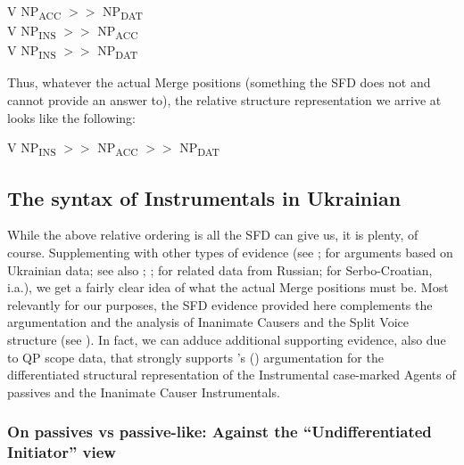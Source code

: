 \documentclass[output=paper,colorlinks,citecolor=brown]{langscibook}
\begin{document}
\ea \label{ex:antonyuk:31}
  V NP\textsubscript{ACC} $>>$ NP\textsubscript{DAT}\\
V NP\textsubscript{INS} $>>$ NP\textsubscript{ACC} \\
V NP\textsubscript{INS} $>>$ NP\textsubscript{DAT}
\z


\noindent Thus, whatever the actual Merge positions (something the SFD does not and cannot provide an answer to), the relative structure representation we arrive at looks like the following:


\ea%
    \label{ex:antonyuk:32}

          V NP\textsubscript{INS} $>>$ NP\textsubscript{ACC} $>>$ NP\textsubscript{DAT}

\z


\subsection{The syntax of Instrumentals in Ukrainian}
\label{sec:antonyuk:3.2}


While the above relative ordering is all the SFD can give us, it is plenty, of course. Supplementing with other types of evidence (see \citealt{AntonyukMykhaylyk2022}; \citealt{AntonyukUnderReview} for arguments based on Ukrainian data; see also \citealt{Bailyn2010,Bailyn2012}; \citealt{Antonyuk2015,Antonyuk2020,Antonyuk2023}; \citealt{Titov2017} for related data from Russian; \citealt{Kovacevic2020} for Serbo-Croatian, i.a.), we get a fairly clear idea of what the actual Merge positions must be. Most relevantly for our purposes, the SFD evidence provided here complements the argumentation and the analysis of Inanimate Causers and the Split Voice structure (see \citealt{Pylkkänen2002,Pylkkänen2008}). In fact, we can adduce additional supporting evidence, also due to QP scope data, that strongly supports \citeauthor{Lavine2022}'s (\citeyear{Lavine2022, Lavine2023}) argumentation for the differentiated structural representation of the Instrumental case-marked Agents of passives and the Inanimate Causer Instrumentals. 



\subsubsection{On passives vs passive-like: Against the “Undifferentiated Initiator” view}
\label{sec:antonyuk:3.2.1}
\end{document}
